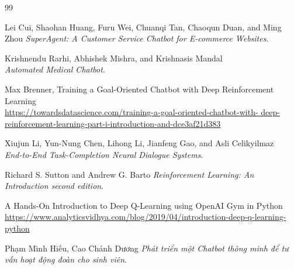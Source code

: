 \begin{thebibliography}{99}

Lei Cui, Shaohan Huang, Furu Wei, Chuanqi Tan, Chaoqun Duan, and Ming Zhou
\textit{SuperAgent: A Customer Service Chatbot for E-commerce Websites}.

Krishnendu Rarhi, Abhishek Mishra, and Krishnasis Mandal\\
\textit{Automated Medical Chatbot}.

Max Brenner, Training a Goal-Oriented Chatbot with Deep Reinforcement Learning\\
\url{https://towardsdatascience.com/training-a-goal-oriented-chatbot-with-
deep-reinforcement-learning-part-i-introduction-and-dce3af21d383}

Xiujun Li, Yun-Nung Chen, Lihong Li, Jianfeng Gao, and Asli Celikyilmaz\\
\textit{End-to-End Task-Completion Neural Dialogue Systems}.

Richard S. Sutton and Andrew G. Barto
\textit{Reinforcement Learning: An Introduction second edition}.

A Hands-On Introduction to Deep Q-Learning using OpenAI Gym in Python
\\\url{https://www.analyticsvidhya.com/blog/2019/04/introduction-deep-q-learning-python}

Phạm Minh Hiếu, Cao Chánh Dương
\textit{Phát triển một Chatbot thông minh để tư vấn hoạt động đoàn cho sinh viên}.

\end{thebibliography}
